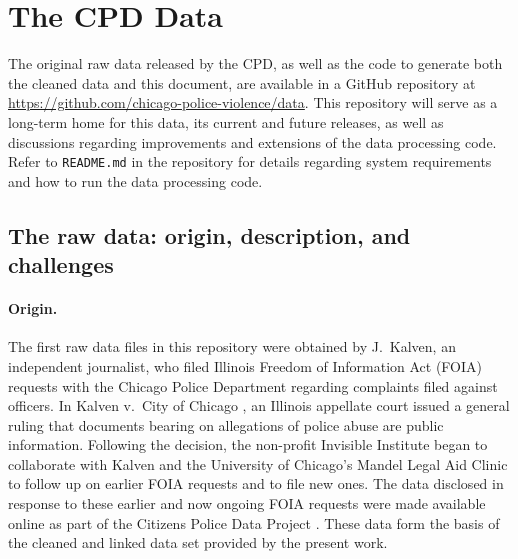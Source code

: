 \section{The CPD Data} \label{sec:data}

The original raw data released by the CPD, as well as the code to generate both
the cleaned data and this document, are available in a GitHub repository at
\url{https://github.com/chicago-police-violence/data}. This repository will
serve as a long-term home for this data, its current and future releases, as
well as discussions regarding improvements and extensions of the data
processing code. Refer to \texttt{README.md} in the repository for details
regarding system requirements and how to run the data processing code. 

\subsection{The raw data: origin, description, and challenges}
\label{sec:raw}

\paragraph{Origin.}
The first raw data files in this repository were obtained by J.~Kalven, an 
independent journalist, who filed Illinois Freedom of Information Act (FOIA) requests with 
the Chicago Police Department regarding complaints filed against officers. 
In Kalven v.~City of Chicago \cite{kalven2014}, an Illinois appellate court issued
a general ruling that documents bearing on allegations of
police abuse are public information. Following 
the decision, the non-profit
Invisible Institute began to collaborate with Kalven 
and the University of Chicago's Mandel Legal Aid
Clinic to follow up on earlier FOIA requests and to file new ones. The data
disclosed in response to these earlier and now ongoing FOIA requests were made available
online as part of the Citizens Police Data Project \cite{cpdp}.
These data form the basis of the cleaned and linked data set provided by the present work.

